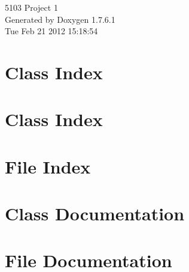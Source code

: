 \documentclass[a4paper]{book}
\begin{document}
\hypersetup{pageanchor=false,citecolor=blue}
\begin{titlepage}
\vspace*{7cm}
\begin{center}
{\Large 5103 \-Project 1 }\\
\vspace*{1cm}
{\large \-Generated by Doxygen 1.7.6.1}\\
\vspace*{0.5cm}
{\small Tue Feb 21 2012 15:18:54}\\
\end{center}
\end{titlepage}
\clearemptydoublepage
{}
\tableofcontents
\clearemptydoublepage
{}
\hypersetup{pageanchor=true,citecolor=blue}
\chapter{\-Class \-Index}

\chapter{\-Class \-Index}

\chapter{\-File \-Index}

\chapter{\-Class \-Documentation}




















\chapter{\-File \-Documentation}













\printindex
\end{document}
